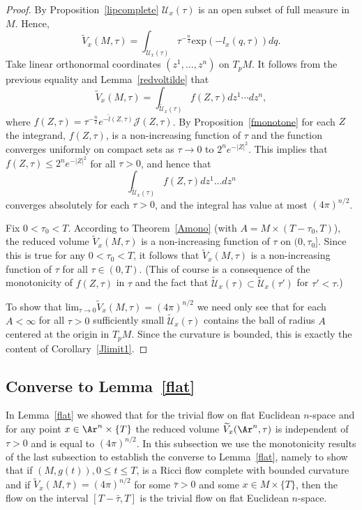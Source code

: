 \begin{proof}
By Proposition~\ref{lipcomplete} ${\mathcal U}_x(\tau)$ is an open
subset of full measure in $M$. Hence, $$\widetilde
V_x(M,\tau)=\int_{{\mathcal U}_x(\tau)}\tau^{-\frac{n}{2}}\mathrm{exp}(-l_x(q,\tau))dq.$$
 Take
linear orthonormal coordinates $(z^1,\ldots,z^n)$ on $T_pM$. It
follows from  the previous equality and Lemma~\ref{redvoltilde} that
$$\widetilde V_x(M,\tau)=\int_{\widetilde {\mathcal U}_{x}(\tau)}f(Z,\tau)dz^1\cdots dz^n,$$
where $f(Z,\tau)=\tau^{-\frac{n}{2}}e^{-\widetilde
l(Z,\tau)}{\mathcal J}(Z,\tau)$. By Proposition~\ref{fmonotone} for
each $Z$ the integrand, $f(Z,\tau)$, is a non-increasing function of
$\tau$ and the function converges uniformly on compact sets as
$\tau\rightarrow 0$ to $2^ne^{-|Z|^2}$. This implies that
$f(Z,\tau)\le 2^ne^{-|Z|^2}$ for all $\tau>0$, and hence that
$$\int_{\widetilde{\mathcal U}_x(\tau)}f(Z,\tau)dz^1\ldots dz^n$$
converges absolutely for each $\tau>0$, and the integral has value
at most $(4\pi)^{n/2}$.

Fix $0<\tau_0<T$. According to Theorem~\ref{Amono} (with $A=M\times
(T-\tau_0,T)$), the reduced volume $\widetilde V_x(M,\tau)$ is a
non-increasing function of $\tau$ on $(0,\tau_0]$. Since this is
true for any $0<\tau_0<T$, it follows that $\widetilde V_x(M,\tau)$
is a non-increasing function of $\tau$ for all $\tau\in (0,T)$.
 (This of course is a consequence of the
monotonicity of $f(Z,\tau)$ in $\tau$ and the fact that $\widetilde {\mathcal
U}_x(\tau)\subset \widetilde {\mathcal U}_x(\tau')$ for $\tau'<\tau$.)



To show that $\mathrm{lim}_{\tau\rightarrow 0}\widetilde
 V_x(M,\tau)= (4\pi)^{n/2}$ we need only see that for
  each $A<\infty$ for all $\tau>0$ sufficiently small
 $\widetilde {\mathcal U}_x(\tau)$ contains the ball of radius $A$ centered at the origin
 in $T_pM$. Since the  curvature is bounded, this is exactly
 the content of Corollary~\ref{Jlimit1}.
\end{proof}



\subsection{Converse to Lemma~{\ref{flat}}}

In Lemma~\ref{flat} we showed that for the trivial flow on flat
Euclidean $n$-space and for any point $x\in \Ar^n\times \{T\}$ the
reduced volume $\widetilde V_x(\Ar^n,\tau)$ is independent of
$\tau>0$  and is equal to $(4\pi)^{n/2}$. In this subsection we use
the monotonicity results of the last subsection to establish the
converse to Lemma~\ref{flat}, namely to show that if $(M,g(t)),0\le
t\le T$, is a Ricci flow complete with bounded curvature and if
$\widetilde V_x(M,\bar\tau)=(4\pi)^{n/2}$ for some $\bar\tau>0$ and
some $x\in M\times\{T\}$, then the flow on the interval
$[T-\bar\tau,T]$ is the trivial flow on flat Euclidean $n$-space.



